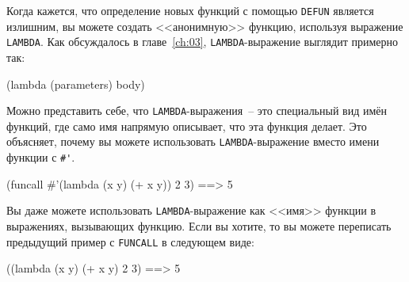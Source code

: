 Когда кажется, что определение новых функций с помощью \lstinline{DEFUN} является излишним, вы
можете создать <<анонимную>> функцию, используя выражение \lstinline{LAMBDA}.  Как обсуждалось в
главе~\ref{ch:03}, \lstinline{LAMBDA}-выражение выглядит примерно так:

\begin{myverb}
(lambda (parameters) body)
\end{myverb}

Можно представить себе, что \lstinline{LAMBDA}-выражения~-- это специальный вид имён функций,
где само имя напрямую описывает, что эта функция делает.  Это объясняет, почему вы можете
использовать \lstinline{LAMBDA}-выражение вместо имени функции с \lstinline!#'!.

\begin{myverb}
(funcall #'(lambda (x y) (+ x y)) 2 3) ==> 5
\end{myverb}

Вы даже можете использовать \lstinline{LAMBDA}-выражение как <<имя>> функции в выражениях,
вызывающих функцию.  Если вы хотите, то вы можете переписать предыдущий пример с
\lstinline{FUNCALL} в следующем виде:

\begin{myverb}
((lambda (x y) (+ x y) 2 3) ==> 5
\end{myverb}

